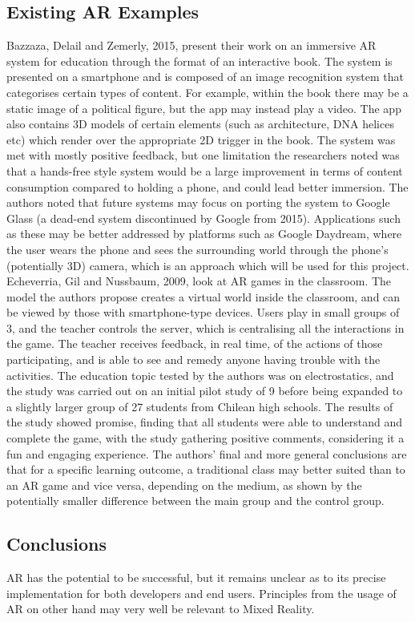 \documentclass[11pt]{report}
\begin{document}
\subsection{Existing AR Examples}
Bazzaza, Delail and Zemerly, 2015\cite{Bazzaza2015}, present their work on an immersive AR system for education through the format of an interactive book. The system is presented on a smartphone and is composed of an image recognition system that categorises certain types of content. For example, within the book there may be a static image of a political figure, but the app may instead play a video. The app also contains 3D models of certain elements (such as architecture, DNA helices etc) which render over the appropriate 2D trigger in the book. The system was met with mostly positive feedback, but one limitation the researchers noted was that a hands-free style system would be a large improvement in terms of content consumption compared to holding a phone, and could lead better immersion. The authors noted that future systems may focus on porting the system to Google Glass (a dead-end system discontinued by Google from 2015). Applications such as these may be better addressed by platforms such as Google Daydream, where the user wears the phone and sees the surrounding world through the phone's (potentially 3D) camera, which is an approach which will be used for this project. Echeverria, Gil and Nussbaum, 2009\cite{Nussbaum2009}, look at AR games in the classroom. The model the authors propose creates a virtual world inside the classroom, and can be viewed by those with smartphone-type devices. Users play in small groups of 3, and the teacher controls the server, which is centralising all the interactions in the game. The teacher receives feedback, in real time, of the actions of those participating, and is able to see and remedy anyone having trouble with the activities. The education topic tested by the authors was on electrostatics, and the study was carried out on an initial pilot study of 9 before being expanded to a slightly larger group of 27 students from Chilean high schools. The results of the study showed promise, finding that all students were able to understand and complete the game, with the study gathering positive comments, considering it a fun and engaging experience. The authors' final and more general conclusions are that for a specific learning outcome, a traditional class may better suited than to an AR game and vice versa, depending on the medium, as shown by the potentially smaller difference between the main group and the control group.
\subsection{Conclusions}
AR has the potential to be successful, but it remains unclear as to its precise implementation for both developers and end users. Principles from the usage of AR on other hand may very well be relevant to Mixed Reality.
\end{document}

